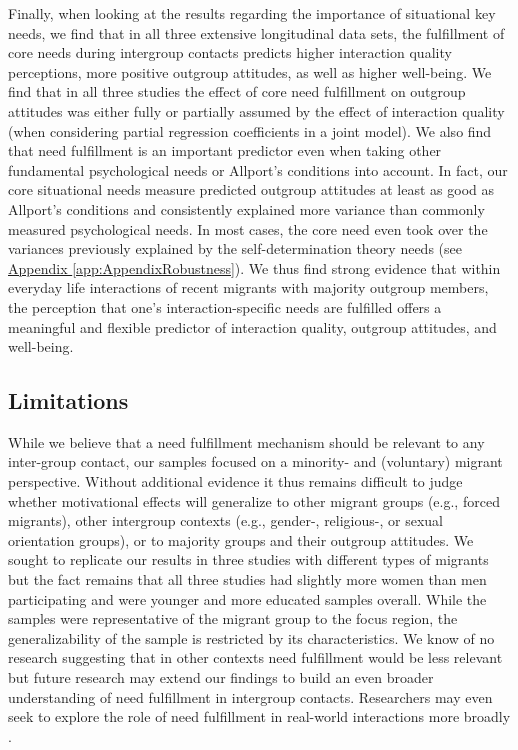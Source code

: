 \documentclass[man, 12pt, a4paper, mask]{apa7}
\theoremstyle{break}
\theoremstyle{plain}
\newcommand{\appref}[2][]{\hyperref[#2]{Appendix \ref*{#2}#1}}
\begin{document}
Finally, when looking at the results regarding the importance of situational key needs, we find that in all three extensive longitudinal data sets, the fulfillment of core needs during intergroup contacts predicts higher interaction quality perceptions, more positive outgroup attitudes, as well as higher well-being. We find that in all three studies the effect of core need fulfillment on outgroup attitudes was either fully or partially assumed by the effect of interaction quality (when considering partial regression coefficients in a joint model). We also find that need fulfillment is an important predictor even when taking other fundamental psychological needs or Allport's conditions into account. In fact, our core situational needs measure predicted outgroup attitudes at least as good as Allport's conditions and consistently explained more variance than commonly measured psychological needs. In most cases, the core need even took over the variances previously explained by the self-determination theory needs (see \appref{app:AppendixRobustness}). We thus find strong evidence that within everyday life interactions of recent migrants with majority outgroup members, the perception that one's interaction-specific needs are fulfilled offers a meaningful and flexible predictor of interaction quality, outgroup attitudes, and well-being.

\subsection{Limitations}
While we believe that a need fulfillment mechanism should be relevant to any inter-group contact, our samples focused on a minority- and (voluntary) migrant perspective. Without additional evidence it thus remains difficult to judge whether motivational effects will generalize to other migrant groups (e.g., forced migrants), other intergroup contexts (e.g., gender-, religious-, or sexual orientation groups), or to majority groups and their outgroup attitudes. We sought to replicate our results in three studies with different types of migrants but the fact remains that all three studies had slightly more women than men participating and were younger and more educated samples overall. While the samples were representative of the migrant group to the focus region, the generalizability of the sample is restricted by its characteristics. We know of no research suggesting that in other contexts need fulfillment would be less relevant but future research may extend our findings to build an even broader understanding of need fulfillment in intergroup contacts. Researchers may even seek to explore the role of need fulfillment in real-world interactions more broadly \citep[also see][]{Downie2008}.
\end{document}
